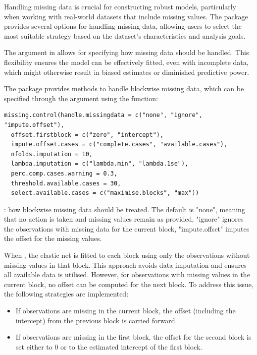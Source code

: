Handling missing data is crucial for constructing robust models, particularly when working with real-world datasets that include missing values. The  package provides several options for handling missing data, allowing users to select the most suitable strategy based on the dataset's characteristics and analysis goals.

The  argument in  allows for specifying how missing data should be handled. This flexibility ensures the model can be effectively fitted, even with incomplete data, which might otherwise result in biased estimates or diminished predictive power.

The  package provides methods to handle blockwise missing data, which can be specified through the  argument using the  function: 
{\small
\begin{lstlisting}
missing.control(handle.missingdata = c("none", "ignore", "impute.offset"),
  offset.firstblock = c("zero", "intercept"),
  impute.offset.cases = c("complete.cases", "available.cases"),
  nfolds.imputation = 10,
  lambda.imputation = c("lambda.min", "lambda.1se"),
  perc.comp.cases.warning = 0.3,
  threshold.available.cases = 30,
  select.available.cases = c("maximise.blocks", "max"))
\end{lstlisting}
}
: how blockwise missing data should be treated. The default is "none", meaning that no action is taken and missing values remain as provided, "ignore" ignores the observations with missing data for the current block, "impute.offset" imputes the offset for the missing values.

When , the elastic net is fitted to each block using only the observations without missing values in that block. This approach avoids data imputation and ensures all available data is utilised. However, for observations with missing values in the current block, no offset can be computed for the next block. 
To address this issue, the following strategies are implemented:
\begin{itemize}
    \item If observations are missing in the current block, the offset (including the intercept) from the previous block is carried forward.
    \item If observations are missing in the first block, 
     the offset for the second block is set either to \(0\) or to the estimated intercept of the first block.
\end{itemize}

